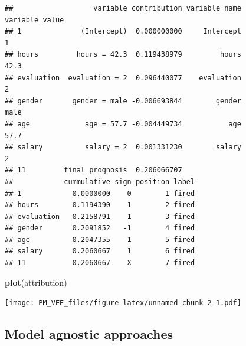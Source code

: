 \documentclass[]{krantz}
\newenvironment{Shaded}{\begin{snugshade}}{\end{snugshade}}
\newcommand{\DataTypeTok}[1]{\textcolor[rgb]{0.13,0.29,0.53}{#1}}
\newcommand{\KeywordTok}[1]{\textcolor[rgb]{0.13,0.29,0.53}{\textbf{#1}}}
\newcommand{\NormalTok}[1]{#1}
\newcommand{\OperatorTok}[1]{\textcolor[rgb]{0.81,0.36,0.00}{\textbf{#1}}}
\newcommand{\StringTok}[1]{\textcolor[rgb]{0.31,0.60,0.02}{#1}}
\theoremstyle{definition}
\theoremstyle{definition}
\theoremstyle{definition}
\theoremstyle{remark}
\begin{document}
\begin{Shaded}
\end{Shaded}

\begin{verbatim}
##                   variable contribution variable_name variable_value
## 1              (Intercept)  0.000000000     Intercept              1
## hours         hours = 42.3  0.119438979         hours           42.3
## evaluation  evaluation = 2  0.096440077    evaluation              2
## gender       gender = male -0.006693844        gender           male
## age             age = 57.7 -0.004449734           age           57.7
## salary          salary = 2  0.001331230        salary              2
## 11         final_prognosis  0.206066707                             
##            cummulative sign position label
## 1            0.0000000    0        1 fired
## hours        0.1194390    1        2 fired
## evaluation   0.2158791    1        3 fired
## gender       0.2091852   -1        4 fired
## age          0.2047355   -1        5 fired
## salary       0.2060667    1        6 fired
## 11           0.2060667    X        7 fired
\end{verbatim}

\begin{Shaded}
\begin{Highlighting}[]
\KeywordTok{plot}\NormalTok{(attribution)}
\end{Highlighting}
\end{Shaded}

\texttt{[image: PM\_VEE\_files/figure-latex/unnamed-chunk-2-1.pdf]}

\hypertarget{modelAgnosticAttribution}{%
\subsection{Model agnostic approaches}\label{modelAgnosticAttribution}}
\end{document}
